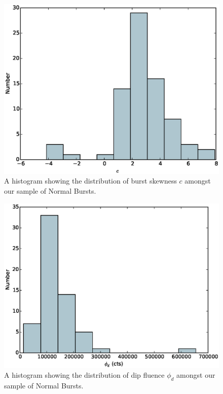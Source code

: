 \begin{figure}
  \centering
  \includegraphics[width=.9\linewidth, trim={0cm 0 0cm 0},clip]{images/appendix_burst_skew_hist.eps}
  \caption{\small A histogram showing the distribution of burst skewness $c$ amongst our sample of Normal Bursts. }
  \label{fig:app_hist_c}
\end{figure}

\begin{figure}
  \centering
  \includegraphics[width=.9\linewidth, trim={0cm 0 0cm 0},clip]{images/appendix_dip_aafluence_hist.eps}
  \caption{\small A histogram showing the distribution of dip fluence $\phi_d$ amongst our sample of Normal Bursts.}
  \label{fig:app_hist_phid}
\end{figure}

